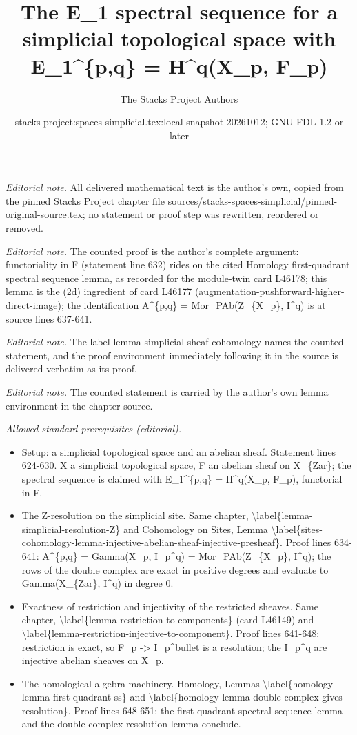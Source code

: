 \documentclass{stacks-project}
\title{The E\_1 spectral sequence for a simplicial topological space with E\_1\textasciicircum{}\{p,q\} = H\textasciicircum{}q(X\_p, F\_p)}
\author{The Stacks Project Authors}
\date{stacks-project:spaces-simplicial.tex:local-snapshot-20261012; GNU FDL 1.2 or later}
\theoremstyle{plain}
\theoremstyle{definition}
\theoremstyle{remark}
\numberwithin{equation}{subsection}
\begin{document}
\maketitle
\noindent\textit{Editorial note.} All delivered mathematical text is the author's own, copied from the pinned Stacks Project chapter file sources/stacks-spaces-simplicial/pinned-original-source.tex; no statement or proof step was rewritten, reordered or removed.\par\medskip
\noindent\textit{Editorial note.} The counted proof is the author's complete argument: functoriality in F (statement line 632) rides on the cited Homology first-quadrant spectral sequence lemma, as recorded for the module-twin card L46178; this lemma is the (2d) ingredient of card L46177 (augmentation-pushforward-higher-direct-image); the identification A\textasciicircum{}\{p,q\} = Mor\_PAb(Z\_\{X\_p\}, I\textasciicircum{}q) is at source lines 637-641.\par\medskip
\noindent\textit{Editorial note.} The label lemma-simplicial-sheaf-cohomology names the counted statement, and the proof environment immediately following it in the source is delivered verbatim as its proof.\par\medskip
\noindent\textit{Editorial note.} The counted statement is carried by the author's own lemma environment in the chapter source.\par\medskip
\noindent\textit{Allowed standard prerequisites (editorial).}\begin{itemize}
\item Setup: a simplicial topological space and an abelian sheaf. Statement lines 624-630. X a simplicial topological space, F an abelian sheaf on X\_\{Zar\}; the spectral sequence is claimed with E\_1\textasciicircum{}\{p,q\} = H\textasciicircum{}q(X\_p, F\_p), functorial in F.
\item The Z-resolution on the simplicial site. Same chapter, \textbackslash{}label\{lemma-simplicial-resolution-Z\} and Cohomology on Sites, Lemma \textbackslash{}label\{sites-cohomology-lemma-injective-abelian-sheaf-injective-presheaf\}. Proof lines 634-641: A\textasciicircum{}\{p,q\} = Gamma(X\_p, I\_p\textasciicircum{}q) = Mor\_PAb(Z\_\{X\_p\}, I\textasciicircum{}q); the rows of the double complex are exact in positive degrees and evaluate to Gamma(X\_\{Zar\}, I\textasciicircum{}q) in degree 0.
\item Exactness of restriction and injectivity of the restricted sheaves. Same chapter, \textbackslash{}label\{lemma-restriction-to-components\} (card L46149) and \textbackslash{}label\{lemma-restriction-injective-to-component\}. Proof lines 641-648: restriction is exact, so F\_p -> I\_p\textasciicircum{}bullet is a resolution; the I\_p\textasciicircum{}q are injective abelian sheaves on X\_p.
\item The homological-algebra machinery. Homology, Lemmas \textbackslash{}label\{homology-lemma-first-quadrant-ss\} and \textbackslash{}label\{homology-lemma-double-complex-gives-resolution\}. Proof lines 648-651: the first-quadrant spectral sequence lemma and the double-complex resolution lemma conclude.
\end{itemize}\medskip
\end{document}
